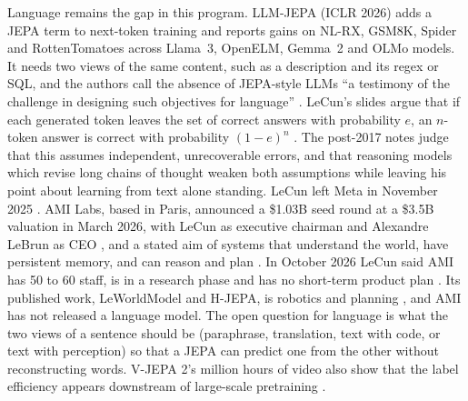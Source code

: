 Language remains the gap in this program. LLM-JEPA (ICLR 2026) adds a JEPA term to next-token training and reports gains on NL-RX, GSM8K, Spider and RottenTomatoes across Llama~3, OpenELM, Gemma~2 and OLMo models. It needs two views of the same content, such as a description and its regex or SQL, and the authors call the absence of JEPA-style LLMs ``a testimony of the challenge in designing such objectives for language'' \cite{post29}. LeCun's slides argue that if each generated token leaves the set of correct answers with probability $e$, an $n$-token answer is correct with probability $(1-e)^n$ \cite{post34,post35}. \opinion{} The post-2017 notes judge that this assumes independent, unrecoverable errors, and that reasoning models which revise long chains of thought weaken both assumptions while leaving his point about learning from text alone standing. LeCun left Meta in November 2025 \cite{post36}. AMI Labs, based in Paris, announced a \$1.03B seed round at a \$3.5B valuation in March 2026, with LeCun as executive chairman and Alexandre LeBrun as CEO \cite{post36,post38}, and a stated aim of systems that understand the world, have persistent memory, and can reason and plan \cite{post37}. In October 2026 LeCun said AMI has 50 to 60 staff, is in a research phase and has no short-term product plan \cite{post39}. Its published work, LeWorldModel and H-JEPA, is robotics and planning \cite{post31,post32}, and AMI has not released a language model. The open question for language is what the two views of a sentence should be (paraphrase, translation, text with code, or text with perception) so that a JEPA can predict one from the other without reconstructing words. V-JEPA 2's million hours of video also show that the label efficiency appears downstream of large-scale pretraining \cite{post28}.

